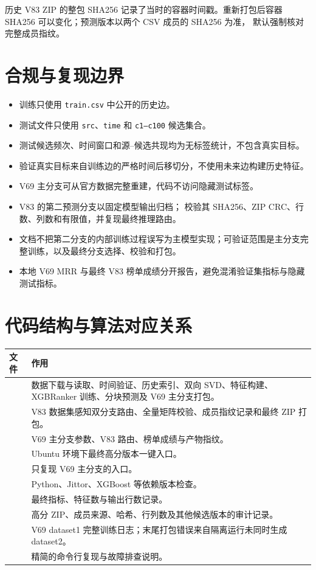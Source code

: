 \documentclass[UTF8,a4paper,11pt]{ctexart}
\begin{document}
历史 V83 ZIP 的整包 SHA256 记录了当时的容器时间戳。重新打包后容器 SHA256 可以变化；预测版本以两个 CSV 成员的 SHA256 为准， 默认强制核对完整成员指纹。

\section{合规与复现边界}
\label{sec:compliance}

\begin{itemize}
  \item 训练只使用 \texttt{train.csv} 中公开的历史边。
  \item 测试文件只使用 \texttt{src}、\texttt{time} 和 \texttt{c1--c100} 候选集合。
  \item 测试候选频次、时间窗口和源--候选共现均为无标签统计，不包含真实目标。
  \item 验证真实目标来自训练边的严格时间后移切分，不使用未来边构建历史特征。
  \item V69 主分支可从官方数据完整重建，代码不访问隐藏测试标签。
  \item V83 的第二预测分支以固定模型输出归档； 校验其 SHA256、ZIP CRC、行数、列数和有限值，并复现最终推理路由。
  \item 文档不把第二分支的内部训练过程误写为主模型实现；可验证范围是主分支完整训练，以及最终分支选择、校验和打包。
  \item 本地 V69 MRR 与最终 V83 榜单成绩分开报告，避免混淆验证集指标与隐藏测试指标。
\end{itemize}

\section{代码结构与算法对应关系}

\begin{tabularx}{\textwidth}{p{4.0cm}Y}
\toprule
文件 & 作用 \\
\midrule
{} & 数据下载与读取、时间验证、历史索引、双向 SVD、特征构建、XGBRanker 训练、分块预测及 V69 主分支打包。 \\
 & V83 数据集感知双分支路由、全量矩阵校验、成员指纹记录和最终 ZIP 打包。 \\
 & V69 主分支参数、V83 路由、榜单成绩与产物指纹。 \\
 & Ubuntu 环境下最终高分版本一键入口。 \\
 & 只复现 V69 主分支的入口。 \\
 & Python、Jittor、XGBoost 等依赖版本检查。 \\
 & 最终指标、特征数与输出行数记录。 \\
 & 高分 ZIP、成员来源、哈希、行列数及其他候选版本的审计记录。 \\
 & V69 dataset1 完整训练日志；末尾打包错误来自隔离运行未同时生成 dataset2。 \\
 & 精简的命令行复现与故障排查说明。 \\
\bottomrule
\end{tabularx}
\end{document}
